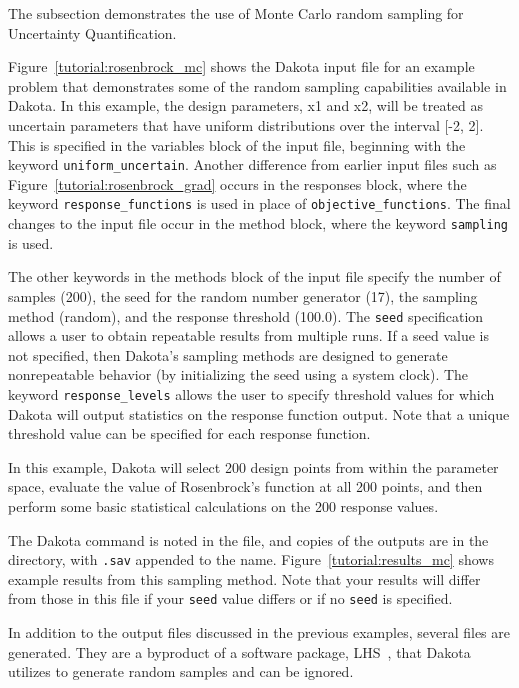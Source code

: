 The subsection demonstrates the use of Monte Carlo random sampling
for Uncertainty Quantification.

Figure~\ref{tutorial:rosenbrock_mc} shows the Dakota input file for
an example problem that demonstrates some of the random sampling
capabilities available in Dakota. In this example, the design
parameters, x1 and x2, will be treated as uncertain parameters that
have uniform distributions over the interval [-2, 2]. This is
specified in the variables block of the input file, beginning with
the keyword \texttt{uniform\_uncertain}.
Another difference from earlier input files such as
Figure~\ref{tutorial:rosenbrock_grad}
occurs in the responses block, where
the keyword \texttt{response\_functions} is used in place of
\texttt{objective\_functions}. The final changes to the input
file occur in the method block, where the keyword
\texttt{sampling} is used.

The other keywords in the methods block of the input file
specify the number of samples (200), the seed for the random number
generator (17), the sampling method (random), and the response
threshold (100.0). The \texttt{seed} specification allows a user to
obtain repeatable results from multiple runs. If a seed value is not
specified, then Dakota's sampling methods are designed to generate
nonrepeatable behavior (by initializing the seed using a system
clock). The keyword \texttt{response\_levels} allows the user to
specify threshold values for which Dakota will output statistics on
the response function output. Note that a unique threshold value can
be specified for each response function.

In this example, Dakota will select 200 design points from within the
parameter space, evaluate the value of Rosenbrock's function at all
200 points, and then perform some basic statistical calculations on
the 200 response values.

The Dakota command is noted in the file, and copies of the outputs are
in the  directory, with
\texttt{.sav} appended to the name.  Figure~\ref{tutorial:results_mc}
shows example results from this sampling method.  Note that your
results will differ from those in this file if your \texttt{seed}
value differs or if no \texttt{seed} is specified.

In addition to the output files discussed in the previous examples, several
 files are generated. They are a byproduct of a software
package, LHS~\cite{Swi04}, that Dakota utilizes to generate random samples and
can be ignored.

